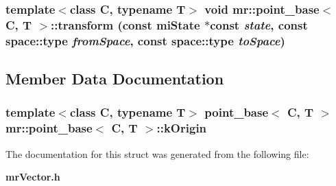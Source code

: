 \subsubsection{\setlength{\rightskip}{0pt plus 5cm}template$<$class C, typename T$>$ void {\bf mr::point\_\-base}$<$ C, T $>$::transform (const mi\-State $\ast$const {\em state}, const {\bf space::type} {\em from\-Space}, const {\bf space::type} {\em to\-Space})\hspace{0.3cm}{\tt  [inline]}}\label{structmr_1_1point__base_z74_16}




\subsection{Member Data Documentation}
\subsubsection{\setlength{\rightskip}{0pt plus 5cm}template$<$class C, typename T$>$ {\bf point\_\-base}$<$ C, T $>$ {\bf mr::point\_\-base}$<$ C, T $>$::{\bf k\-Origin}\hspace{0.3cm}{\tt  [static]}}\label{structmr_1_1point__base_s0}




The documentation for this struct was generated from the following file:\begin{CompactItemize}
\item 
{\bf mr\-Vector.h}\end{CompactItemize}
